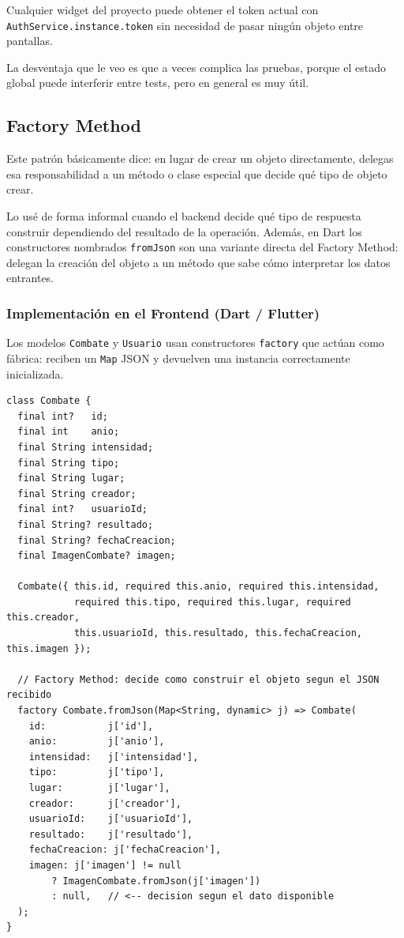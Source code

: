 \documentclass{article}
\begin{document}
Cualquier widget del proyecto puede obtener el token actual con
\texttt{AuthService.instance.token} sin necesidad de pasar ning\'un objeto
entre pantallas.
 
La desventaja que le veo es que a veces complica las pruebas, porque el
estado global puede interferir entre tests, pero en general es muy \'util.
 
\subsection{Factory Method}
 
Este patr\'on b\'asicamente dice: en lugar de crear un objeto directamente,
delegas esa responsabilidad a un m\'etodo o clase especial que decide qu\'e
tipo de objeto crear.
 
Lo us\'e de forma informal cuando el backend decide qu\'e tipo de respuesta
construir dependiendo del resultado de la operaci\'on. Adem\'as, en Dart los
constructores nombrados \texttt{fromJson} son una variante directa del
Factory Method: delegan la creaci\'on del objeto a un m\'etodo que sabe c\'omo
interpretar los datos entrantes.
 
\subsubsection*{Implementaci\'on en el Frontend (Dart / Flutter)}
 
Los modelos \texttt{Combate} y \texttt{Usuario} usan constructores
\texttt{factory} que act\'uan como f\'abrica: reciben un \texttt{Map} JSON y
devuelven una instancia correctamente inicializada.
 
\begin{lstlisting}[style=dartStyle, caption={Factory Method en el modelo Combate (lib/models/combate.dart)}]
class Combate {
  final int?   id;
  final int    anio;
  final String intensidad;
  final String tipo;
  final String lugar;
  final String creador;
  final int?   usuarioId;
  final String? resultado;
  final String? fechaCreacion;
  final ImagenCombate? imagen;
 
  Combate({ this.id, required this.anio, required this.intensidad,
            required this.tipo, required this.lugar, required this.creador,
            this.usuarioId, this.resultado, this.fechaCreacion, this.imagen });
 
  // Factory Method: decide como construir el objeto segun el JSON recibido
  factory Combate.fromJson(Map<String, dynamic> j) => Combate(
    id:           j['id'],
    anio:         j['anio'],
    intensidad:   j['intensidad'],
    tipo:         j['tipo'],
    lugar:        j['lugar'],
    creador:      j['creador'],
    usuarioId:    j['usuarioId'],
    resultado:    j['resultado'],
    fechaCreacion: j['fechaCreacion'],
    imagen: j['imagen'] != null
        ? ImagenCombate.fromJson(j['imagen'])
        : null,   // <-- decision segun el dato disponible
  );
}
\end{lstlisting}
 
\end{document}
